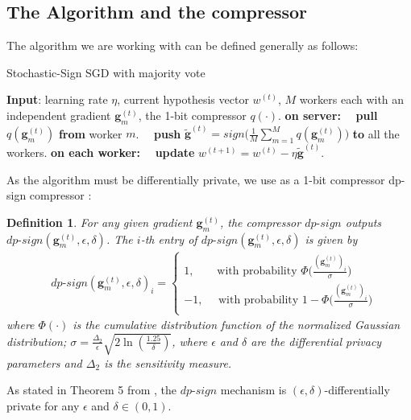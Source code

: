 \documentclass[12pt]{article}
\newtheorem{definition}{Definition}
\begin{document}
\subsection{The Algorithm and the compressor}
The algorithm we are working with can be defined generally as follows:
\begin{algorithm}
    \caption{Stochastic-Sign SGD with majority vote}
    \label{QuantizedSIGNSGD}
    \begin{algorithmic}
        \STATE \textbf{Input}: learning rate $\eta$, current hypothesis vector $w^{(t)}$, $M$ workers each with an independent gradient $\boldsymbol{g}_{m}^{(t)}$, the 1-bit compressor $q(\cdot)$.
        \STATE \textbf{on server:}
        \STATE ~~\textbf{pull} $q(\boldsymbol{g}_{m}^{(t)})$ \textbf{from} worker $m$.
        \STATE ~~\textbf{push} $\tilde{\boldsymbol{g}}^{(t)}= sign\big(\frac{1}{M}\sum_{m=1}^{M}q(\boldsymbol{g}_{m}^{(t)})\big)$ \textbf{to} all the workers.
        \STATE \textbf{on each worker:}
        \STATE ~~\textbf{update} $w^{(t+1)} = w^{(t)} - \eta\tilde{\boldsymbol{g}}^{(t)}$.
    \end{algorithmic}
\end{algorithm}    

As the algorithm must be differentially private, we use as a 1-bit compressor dp-sign compressor \cite{Jin2020}:

\begin{definition}
    For any given gradient $\boldsymbol{g}_{m}^{(t)}$, the compressor $dp\text{-}sign$ outputs $dp\text{-}sign(\boldsymbol{g}_{m}^{(t)},\epsilon,\delta)$. The $i$-th entry of $dp\text{-}sign(\boldsymbol{g}_{m}^{(t)},\epsilon,\delta)$ is given by
    \begin{equation}\label{dpsignsgd}
    \begin{split}
    &dp\text{-}sign(\boldsymbol{g}_{m}^{(t)},\epsilon,\delta)_{i} =
    \begin{cases}
    1, ~~~~~~~~~ \text{with probability $\Phi\big(\frac{(\boldsymbol{g}_{m}^{(t)})_{i}}{\sigma}\big)$} \\
    -1,  ~~~~~~\text{with probability $1-\Phi\big(\frac{(\boldsymbol{g}_{m}^{(t)})_{i}}{\sigma}\big)$}\\
    \end{cases}
    \end{split}
    \end{equation}
    where $\Phi(\cdot)$ is the cumulative distribution function of the normalized Gaussian distribution; $\sigma = \frac{\Delta_{2}}{\epsilon}\sqrt{2\ln(\frac{1.25}{\delta})}$, where $\epsilon$ and $\delta$ are the differential privacy parameters and $\Delta_2$ is the sensitivity measure.
\end{definition}
As stated in Theorem 5 from \cite{Jin2020}, the $dp\text{-}sign$ mechanism is $(\epsilon, \delta)$-differentially private for any $\epsilon$ and $\delta \in (0, 1)$.
\end{document}
